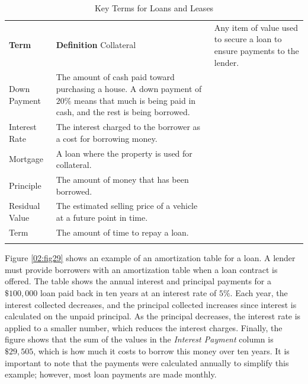 \begin{table}[H]
	{\small
		\begin{longtable}{L{0.75in}L{3.50in}} %
			\textbf{Term} & \textbf{Definition} \endhead
			\hline
			Collateral & Any item of value used to secure a loan to ensure payments to the lender.\\
			Down Payment & The amount of cash paid toward purchasing a house. A down payment of $ 20\% $ means that much is being paid in cash, and the rest is being borrowed.\\
			Interest Rate & The interest charged to the borrower as a cost for borrowing money.\\
			Mortgage & A loan where the property is used for collateral.\\
			Principle & The amount of money that has been borrowed.\\
			Residual Value & The estimated selling price of a vehicle at a future point in time.\\
			Term & The amount of time to repay a loan.\\
			\caption{Key Terms for Loans and Leases}
			\label{02:tab05}
		\end{longtable}
	} %
\end{table}

Figure \ref{02:fig29} shows an example of an amortization table for a loan. A lender must provide borrowers with an amortization table when a loan contract is offered. The table shows the annual interest and principal payments for a $ \$100,000 $ loan paid back in ten years at an interest rate of $ 5\% $. Each year, the interest collected decreases, and the principal collected increases since interest is calculated on the unpaid principal. As the principal decreases, the interest rate is applied to a smaller number, which reduces the interest charges. Finally, the figure shows that the sum of the values in the \textit{Interest Payment} column is $ \$29,505 $, which is how much it costs to borrow this money over ten years. It is important to note that the payments were calculated annually to simplify this example; however, most loan payments are made monthly.

